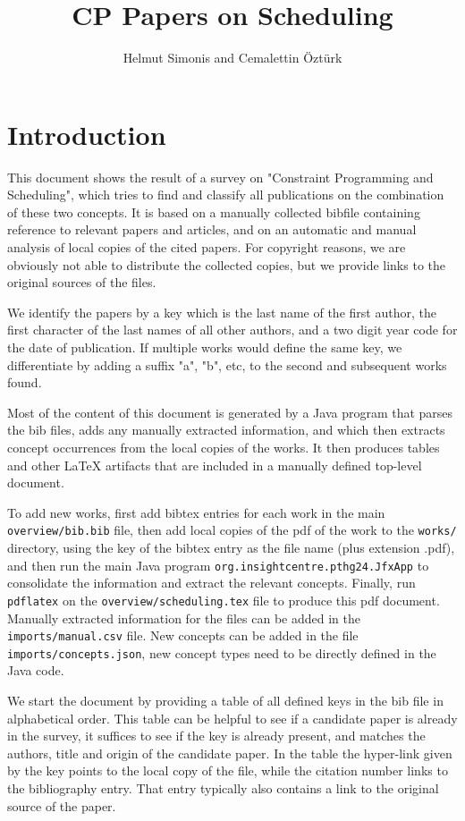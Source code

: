 \documentclass[a4paper]{article}
\title{CP Papers on Scheduling}
\author{Helmut Simonis and Cemalettin Öztürk}
\begin{document}

\maketitle
\section{Introduction}

This document shows the result of a survey on "Constraint Programming and Scheduling", which tries to find and classify all publications on the combination of these two concepts. It is based on a manually collected bibfile containing reference to relevant papers and articles, and on an automatic and manual analysis of local copies of the cited papers. For copyright reasons, we are obviously not able to distribute the collected copies, but we provide links to the original sources of the files. 

We identify the papers by a key which is the last name of the first author, the first character of the last names of all other authors, and a two digit year code for the date of publication. If multiple works would define the same key, we differentiate by adding a suffix "a", "b", etc, to the second and subsequent works found.

Most of the content of this document is generated by a Java program that parses the bib files, adds any manually extracted information, and which then extracts concept occurrences from the local copies of the works. It then produces tables and other LaTeX  artifacts that are included in a manually defined top-level document.

To add new works, first add bibtex entries for each work in the main \texttt{overview/bib.bib} file, then add local copies of the pdf of the work to the \texttt{works/} directory, using the key of the bibtex entry as the file name (plus extension .pdf), and then run the main Java program \texttt{org.insightcentre.pthg24.JfxApp} to consolidate the information and extract the relevant concepts. Finally, run \texttt{pdflatex} on the \texttt{overview/scheduling.tex} file to produce this pdf document. Manually extracted information for the files can be added in the \texttt{imports/manual.csv} file. New concepts can be added in the file \texttt{imports/concepts.json}, new concept types need to be directly defined in the Java code.

We start the document by providing a table of all defined keys in the bib file in alphabetical order. This table can be helpful to see if a candidate paper is already in the survey, it suffices to see if the key is already present, and matches the authors, title and origin of the candidate paper. In the table the hyper-link given by the key points to the local copy of the file, while the citation number links to the bibliography entry. That entry typically also contains a link to the original source of the paper.
\end{document}
